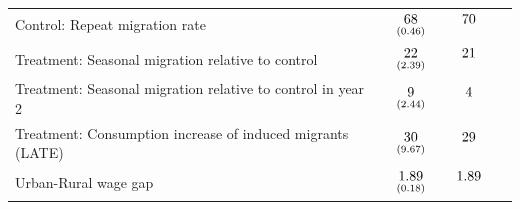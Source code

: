 \documentclass[12pt,pdftex]{article}
\begin{document}
\begin{table}[t]
\begin{center}
\begin{tabular}{l l c c}
 Control: Repeat migration rate&
$\begin{array}{c}68\vspace{-.15cm}\\ \scriptstyle (0.46)\end{array}$ &
$\begin{array}{c}70\vspace{-.15cm}\\ \scriptstyle \phantom{(0.46)}\end{array}$ & \\

Treatment: Seasonal migration relative to control &
 $\begin{array}{c}22\vspace{-.15cm}\\ \scriptstyle (2.39)\end{array}$ &
$\begin{array}{c}21\vspace{-.15cm}\\ \scriptstyle \phantom{(2.39)}\end{array}$ & \\


Treatment: Seasonal migration relative to control in year 2 &
 $\begin{array}{c}9\vspace{-.15cm}\\ \scriptstyle (2.44)\end{array}$ &
$\begin{array}{c}4\vspace{-.15cm}\\ \scriptstyle \phantom{(2.44)}\end{array}$ & \\


Treatment: Consumption increase of induced migrants (LATE)  &
$\begin{array}{c}30\vspace{-.15cm}\\ \scriptstyle (9.67)\end{array}$ &
$\begin{array}{c}29\vspace{-.15cm}\\ \scriptstyle \phantom{(9.67)}\end{array}$ & \\

\hline
Urban-Rural wage gap &
$\begin{array}{c}1.89\vspace{-.15cm}\\ \scriptstyle (0.18)\end{array}$ &
$\begin{array}{c}1.89\vspace{-.15cm}\\ \scriptstyle \phantom{(0.18)}\end{array}$ & \\


\end{tabular}
\end{center}
\end{table}
\end{document}

